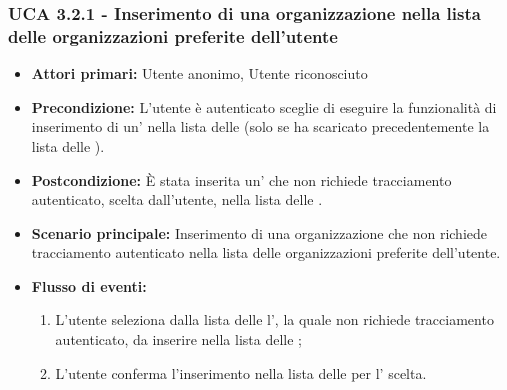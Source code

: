 \subsubsection{UCA 3.2.1 - Inserimento di una organizzazione nella lista delle organizzazioni preferite dell'utente}%
\begin{itemize}
	\item \textbf{Attori primari:} Utente anonimo, Utente riconosciuto
	\item \textbf{Precondizione:} L'utente è autenticato sceglie di eseguire la funzionalità di inserimento di un' nella lista delle  (solo se ha scaricato precedentemente la lista delle ).
	\item \textbf{Postcondizione:} È stata inserita un' che non richiede tracciamento autenticato, scelta dall'utente, nella lista delle .
	\item \textbf{Scenario principale:} Inserimento di una organizzazione che non richiede tracciamento autenticato nella lista delle organizzazioni preferite dell'utente.
	\item \textbf{Flusso di eventi:}
	\begin{enumerate}
		\item L'utente seleziona dalla lista delle  l', la quale non richiede tracciamento autenticato, da inserire nella lista delle ;
		\item L'utente conferma l'inserimento nella lista delle  per l' scelta.
	\end{enumerate}
\end{itemize}

